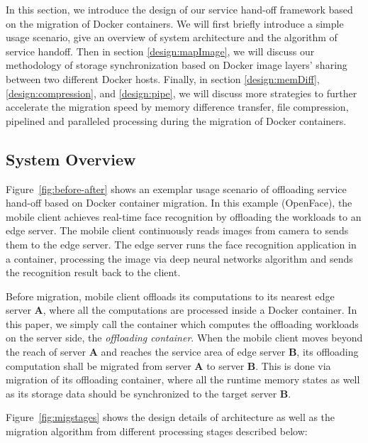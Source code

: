


In this section, we introduce the design of our service hand-off framework based on the migration of Docker containers. We will first briefly introduce a simple usage scenario, give an overview of system architecture and the algorithm of service handoff. Then in section \ref{design:mapImage}, we will discuss our methodology of storage synchronization based on Docker image layers' sharing between two different Docker hosts. Finally, in section \ref{design:memDiff}, \ref{design:compression}, and \ref{design:pipe}, we will discuss more strategies to further accelerate the migration speed by memory difference transfer, file compression, pipelined and paralleled processing during the migration of Docker containers.

\subsection{System Overview}

Figure~\ref{fig:before-after} shows an exemplar usage scenario of offloading service hand-off based on Docker container migration. 
In this example (OpenFace\cite{openface2016}), the mobile client achieves real-time face recognition by offloading the workloads to an edge server. 
The mobile client continuously reads images from camera to sends them to the edge server. 
The edge server runs the face recognition application in a container, processing the image via deep neural networks algorithm and sends the recognition result  back to the client. 

Before migration, mobile client offloads its computations to its nearest edge server \textbf{A}, where all the computations are processed inside a Docker container. 
In this paper, we simply call the container which computes the offloading workloads on the server side, the \textit{offloading container}.
When the mobile client moves beyond the reach of server \textbf{A} and reaches the service area of edge server \textbf{B}, its offloading computation shall be migrated from server \textbf{A} to server \textbf{B}. This is done via migration of its offloading container, where all the runtime memory states as well as its storage data should be synchronized to the target server \textbf{B}.




Figure~\ref{fig:migstages} shows the design details of architecture as well as the migration algorithm from different processing stages described below:

